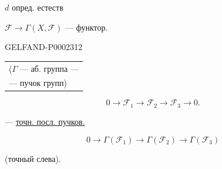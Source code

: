 $d$ опред. естеств



$\mathcal F\to\Gamma(X,\mathcal F)$ — функтор.



\begin{GelfandAdjacentEvidence}{GELFAND-P000231}{2}
\begin{center}
\begin{tabular}{l}
($\Gamma$ — аб. группа —\\
\hspace{12mm}— пучок групп)
\end{tabular}
\end{center}
\end{GelfandAdjacentEvidence}

\begin{equation*}
 0\to\mathcal F_1\to\mathcal F_2\to\mathcal F_3\to0.
\end{equation*}



— \underline{точн. посл. пучков.}



\begin{equation*}
 0\to\Gamma(\mathcal F_1)\to\Gamma(\mathcal F_2)\to\Gamma(\mathcal F_3)
\end{equation*}



(точный слева).



